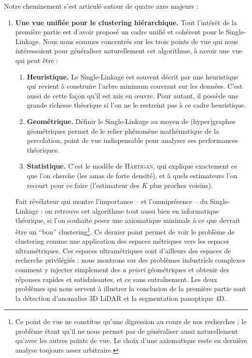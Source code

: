 Notre cheminement s'est articulé autour de quatre axes majeurs :
\begin{enumerate}
    \item \textbf{Une vue unifiée pour le clustering hiérarchique.} Tout l'intérêt de la première partie est d'avoir proposé un cadre unifié et cohérent pour le Single-Linkage. Nous nous sommes concentrés sur les trois points de vue qui nous intéressaient pour généraliser naturellement cet algorithme, à savoir une vue qui peut être :
    \begin{enumerate}
        \item \textbf{Heuristique.} Le Single-Linkage est souvent décrit par une heuristique qui revient à construire l'arbre minimum couvrant sur les données. C'est aussi de cette façon qu'il est mis en œuvre. Pour autant, il possède une grande richesse théorique si l'on ne le restreint pas à ce cadre heuristique.
        \item \textbf{Geométrique.} Définir le Single-Linkage au moyen de (hyper)graphes géométriques permet de le relier phénomène mathématique de la percolation, point de vue indispensable pour analyser ses performances théoriques.
        \item \textbf{Statistique.} C'est le modèle de \textsc{Hartigan}, qui explique exactement ce que l'on cherche (les amas de forte densité), et à quels estimateurs l'on recourt pour ce faire (l'estimateur des $K$ plus proches voisins).
    \end{enumerate}
    Fait révélateur qui montre l'importance -- et l'omniprésence -- du Single-Linkage : on retrouve cet algorithme tout aussi bien en informatique théorique, si l'on souhaite poser une axiomatique minimale à ce que devrait être un ``bon'' clustering\footnote{Ce point de vue ne constitue qu'une digression au cours de nos recherches ; le problème étant qu'il ne nous permet pas de généraliser aussi naturellement qu'avec les autres points de vue. Le choix d'une axiomatique reste en dernière analyse toujours assez arbitraire.}.
    Ce dernier point permet de voir le problème de clustering comme une application des espaces métriques vers les espaces ultramétriques. Ces espaces ultramétriques sont d'ailleurs des espaces de recherche privilégiés : nous montrons sur des problèmes industriels complexes comment y injecter simplement des \emph{a priori} géométriques et obtenir des réponses rapides et satisfaisantes, et ce sans entraînement. Les deux problèmes qui nous servent à illustrer la conclusion de la première partie sont la détection d'anomalies 3D LiDAR et la segmentation panoptique 4D.

\end{enumerate}
